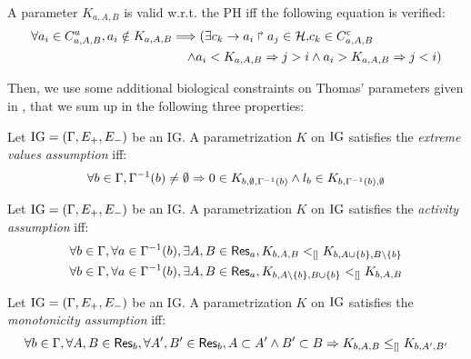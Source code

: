 \begin{property}\label{pro:K-valid}
A parameter $K_{a,A,B}$ is valid w.r.t. the PH iff the following equation is verified:
\begin{align*}
\forall a_i\in C^a_{a,A,B},
		a_i \notin K_{a,A,B} \Longrightarrow (
  \exists c_k\rightarrow a_i\Rsh a_j\in\mathcal{H}, & c_k \in C^c_{a,A,B} \\
 \wedge a_i < K_{a,A,B} \Rightarrow j > i 
 & \wedge  a_i > K_{a,A,B} \Rightarrow j <i )
\end{align*}
\end{property}
		

Then, we use some additional biological constraints on Thomas' parameters given in
\cite{BernotSemBRN}, that we sum up in the following three properties:

\begin{property}
Let $\mathrm{IG} = (\Gamma, E_+, E_-)$ be an IG. A parametrization $K$ on $\mathrm{IG}$ satisfies the \emph{extreme values assumption} iff:
\label{prop:param_enum_extreme}
\[
  \forall b \in \Gamma, \Gamma^{-1}(b) \neq \emptyset \Rightarrow 0 \in K_{b,\emptyset,\Gamma^{-1}(b)} \wedge l_b \in K_{b,\Gamma^{-1}(b),\emptyset}
\]
\end{property}

\begin{property}
\label{prop:param_enum_activity}
Let $\mathrm{IG} = (\Gamma, E_+, E_-)$ be an IG. A parametrization $K$ on $\mathrm{IG}$ satisfies the \emph{activity assumption} iff:
\begin{align*}
  \forall b \in \Gamma, \forall a \in \Gamma^{-1}(b), \exists A,B \in \mathsf{Res}_{a}, K_{b,A,B} <_{[]} K_{b,A \cup \{b\},B \setminus \{b\}}
\\
  \forall b \in \Gamma, \forall a \in \Gamma^{-1}(b), \exists A,B \in \mathsf{Res}_{a}, K_{b,A \setminus \{b\},B \cup \{b\}} <_{[]} K_{b,A,B}
\end{align*}
\end{property}

\begin{property}
\label{prop:param_enum_monotonicity}
Let $\mathrm{IG} = (\Gamma, E_+, E_-)$ be an IG. A parametrization $K$ on $\mathrm{IG}$ satisfies the \emph{monotonicity assumption} iff:
\[
  \forall b \in \Gamma, \forall A,B \in \mathsf{Res}_{b}, \forall A',B' \in \mathsf{Res}_{b},
  A \subset A' \wedge B' \subset B \Rightarrow K_{b,A,B} \leq_{[]} K_{b,A',B'}
\]
\end{property}

